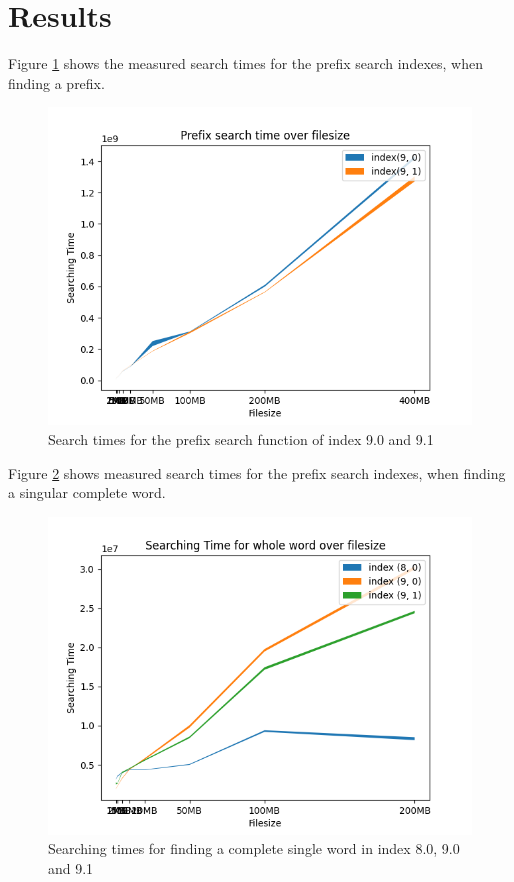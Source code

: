\section{Results}
Figure \ref{fig:SearchtimePrefix} shows the measured search times for the prefix search indexes, when finding a prefix.

\begin{figure}[ht!]
    \centering
    \includegraphics[width=.8\textwidth]{LaTeX/Pictures/Results/Prefixsearch.png}
    \caption{Search times for the prefix search function of index 9.0 and 9.1}
    \label{fig:SearchtimePrefix}
\end{figure}

Figure \ref{fig:findword} shows measured search times for the prefix search indexes, when finding a singular complete word.

\begin{figure}[ht!]
    \centering
    \includegraphics[width=.8\textwidth]{LaTeX/Pictures/Results/Findword.png}
    \caption{Searching times for finding a complete single word in index 8.0, 9.0 and 9.1}
    \label{fig:findword}
\end{figure}

